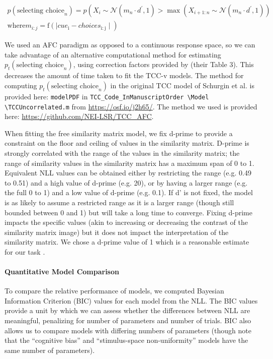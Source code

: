 \begin{multline}
    p\left(\text{selecting choice}_n\right)=p\left(X_i \sim \mathcal{N}\left(m_n \cdot d^{\prime}, 1\right)>\max \left(X_{i+1: n} \sim \mathcal{N}\left(m_n \cdot d^{\prime}, 1\right)\right)\right. \\
    \text{where} m_{i: j}=\mathrm{f}\left(\mid\right. cue _{\mathrm{i}}- choices \left._{\mathrm{i}: \mathrm{j}} \mid\right)
\end{multline}

We used an AFC paradigm as opposed to a continuous response space, so we can take advantage of an alternative computational method for estimating $p_t(\text{selecting choice}_n)$, using correction factors provided by \citet{mcgraw_common_1992} (their Table 3). 
This decreases the amount of time taken to fit the TCC-v models. 
The method for computing $p_t(\text{selecting choice}_n)$ in the original TCC model of Schurgin et al. is provided here: \verb|modelPDF| in \verb|TCC_Code_InManuscriptOrder |\verb|\Model| \verb|\TCCUncorrelated.m| from \url{https://osf.io/j2h65/}. 
The method we used is provided here: \url{https://github.com/NEI-LSR/TCC_AFC}.

When fitting the free similarity matrix model, we fix d-prime to provide a constraint on the floor and ceiling of values in the similarity matrix.
D-prime is strongly correlated with the range of the values in the similarity matrix; the range of similarity values in the similarity matrix has a maximum span of 0 to 1. 
Equivalent NLL values can be obtained either by restricting the range (e.g. 0.49 to 0.51) and a high value of d-prime (e.g. 20), or by having a larger range (e.g. the full 0 to 1) and a low value of d-prime (e.g. 0.1). 
If d’ is not fixed, the model is as likely to assume a restricted range as it is a larger range (though still bounded between 0 and 1) but will take a long time to converge. 
Fixing d-prime impacts the specific values (akin to increasing or decreasing the contrast of the similarity matrix image) but it does not impact the interpretation of the similarity matrix. 
We chose a d-prime value of 1 which is a reasonable estimate for our task \citep{schurgin_psychophysical_2020}.

\paragraph{Quantitative Model Comparison}
To compare the relative performance of models, we computed Bayesian Information Criterion (BIC) values for each model from the NLL. 
The BIC values provide a unit by which we can assess whether the differences between NLL are meaningful, penalizing for number of parameters and number of trials. 
BIC also allows us to compare models with differing numbers of parameters (though note that the “cognitive bias” and “stimulus-space non-uniformity” models have the same number of parameters).

